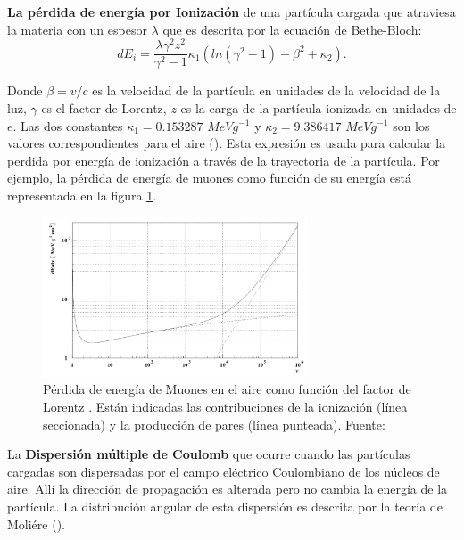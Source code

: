 \textbf{La pérdida de energía por Ionización} de una partícula cargada que atraviesa la materia con un espesor $\lambda$ que es descrita por la ecuación de Bethe-Bloch:
\begin{equation}
dE_{i} = \frac{\lambda \gamma^{2}z^{2}}{\gamma^{2}-1}\kappa_{1}(ln(\gamma^{2}-1)- \beta^{2}+\kappa_{2}).
\label{eq:eq20}
\end{equation}

Donde $\beta = v/c $ es la velocidad de la partícula en unidades de la velocidad de la luz, $\gamma$ es el factor de Lorentz, $z$ es la carga de la partícula ionizada en unidades de $e$. Las dos constantes $\kappa_{1}= 0.153287$ $ MeV g^{-1}$ y $\kappa_{2}= 9.386417 $ $MeV g^{-1}$ son los valores correspondientes para el aire (\cite{Heck1998}). Esta expresión es usada para calcular la perdida por energía de ionización a través de la trayectoria de la partícula. Por ejemplo, la pérdida de energía de muones como función de su energía está representada en la figura \ref{fig:fig4}.
\begin{figure}[htb!]
\centering
        \includegraphics[width=0.7\textwidth]{Figs/Bethe_Muons.png}
        \caption[Ecuación de Bethe-Bloch para los muones.]{Pérdida de energía de Muones en el aire como función del factor de Lorentz . Están indicadas las contribuciones de la ionización (línea seccionada) y la producción de pares (línea punteada). Fuente: \cite{Heck1998}}
        \label{fig:fig4}
\end{figure}

La \textbf{Dispersión múltiple de Coulomb} que ocurre cuando las partículas cargadas son dispersadas por el campo eléctrico Coulombiano de los núcleos de aire. Allí la dirección de propagación es alterada pero no cambia la energía de la partícula. La distribución angular de esta dispersión es descrita por la teoría de Moliére (\cite{Heck1998}).  

